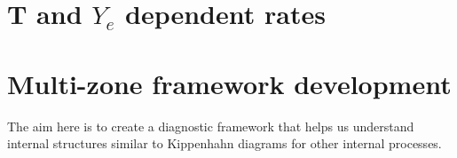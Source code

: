 \documentclass{article}
\begin{document}
\section*{T and $Y_{e}$ dependent rates}

\section*{Multi-zone framework development}

The aim here is to create a diagnostic framework that helps us understand internal structures similar to Kippenhahn diagrams for 
other internal processes.

\singlespacing



\end{document}
